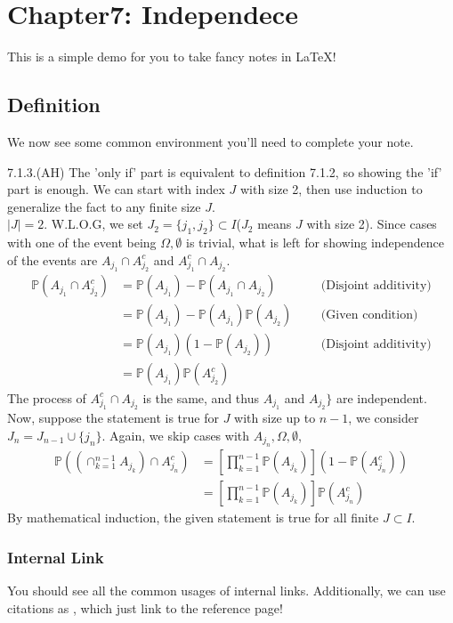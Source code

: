 \section*{Chapter7: Independece}

This is a simple demo for you to take fancy notes in \LaTeX!

\subsection{Definition}
We now see some common environment you'll need to complete your note.

\begin{answer}
	7.1.3.(AH) The 'only if' part is equivalent to definition 7.1.2, so showing the 'if' part is enough. We can start with index $J$ with size 2, then use induction to generalize the fact to any finite size $J$.
	\\
	$|J|= 2$. W.L.O.G, we set $J_2 = \{j_1,j_2\} \subset I$($J_2$ means $J$ with size 2). Since cases with one of the event being $\Omega, \emptyset$ is trivial, what is left for showing independence of the events are $A_{j_1}\cap A_{j_2}^c$ and $ A_{j_1}^c \cap A_{j_2}$. 
	\begin{equation*}
		\begin{aligned}
			\mathbb{P}(A_{j_1} \cap A_{j_2}^{c}) &=  \mathbb{P}(A_{j_1}) - \mathbb{P}(A_{j_1} \cap A_{j_2})  \qquad && \text{(Disjoint additivity)}
			\\ &= \mathbb{P}(A_{j_1}) - \mathbb{P}(A_{j_1})\mathbb{P}(A_{j_2}) && \text{(Given condition)}
			\\ &= \mathbb{P}(A_{j_1})(1 - \mathbb{P}(A_{j_2})) && \text{(Disjoint additivity)}
			\\ &= \mathbb{P}(A_{j_1})\mathbb{P}(A_{j_2}^c) 
		\end{aligned}
	\end{equation*}
	The process of $A_{j_1}^c \cap A_{j_2}$ is the same, and thus $A_{j_1}$ and $A_{j_2}\}$ are independent.  
	Now, suppose the statement is true for $J$ with size up to $n-1$, we consider $J_n = J_{n-1} \cup \{j_n\}$. Again, we skip cases with $A_{j_n},\Omega, \emptyset$,
	\begin{equation*}
		\begin{aligned}
			\mathbb{P}((\cap_{k=1}^{n-1} A_{j_k}) \cap A_{j_n}^c)  &= [\prod_{k=1}^{n-1}\mathbb{P}(A_{j_k})](1 - \mathbb{P}(A_{j_n}^c))
			\\ &=  [\prod_{k=1}^{n-1}\mathbb{P}(A_{j_k})] \mathbb{P}(A_{j_n}^c) 
		\end{aligned}
	\end{equation*}
	By mathematical induction, the given statement is true for all finite $J \subset I$. 
\end{answer}


\subsubsection{Internal Link}
You should see all the common usages of internal links. Additionally, we can use citations as \cite{newton1726philosophiae}, which just link
to the reference page!
